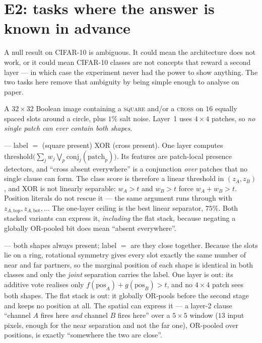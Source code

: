 \section{E2: tasks where the answer is known in advance}
\label{sec:synthetic}

A null result on CIFAR-10 is ambiguous. It could mean the architecture does not work, or it
could mean CIFAR-10 classes are not concepts that reward a second layer --- in which case the
experiment never had the power to show anything. The two tasks here remove that ambiguity by
being simple enough to analyse on paper.

 A $32\times32$ Boolean image containing a \textsc{square} and/or a
\textsc{cross} on $16$ equally spaced slots around a circle, plus $1\%$ salt noise. Layer~1
uses $4\times4$ patches, so \emph{no single patch can ever contain both shapes}.

 --- label $=$ (square present) XOR (cross present). One layer computes
$\mathrm{threshold}\big(\sum_j w_j \bigvee_p \mathrm{conj}_j(\text{patch}_p)\big)$. Its
features are patch-local presence detectors, and ``cross absent everywhere'' is a conjunction
\emph{over} patches that no single clause can form. The class score is therefore a linear
threshold in $(z_A, z_B)$, and XOR is not linearly separable: $w_A > t$ and $w_B > t$ force
$w_A + w_B > t$. Position literals do not rescue it --- the same argument runs through with
$z_{A,\text{top}}, z_{A,\text{bot}}, \dots$ The one-layer ceiling is the best linear
separator, $75\%$. Both stacked variants can express it, \emph{including} the flat stack,
because negating a globally OR-pooled bit does mean ``absent everywhere''.

 --- both shapes always present; label $=$ are they close together.
Because the slots lie on a ring, rotational symmetry gives every slot exactly the same number
of near and far partners, so the marginal position of each shape is identical in both classes
and only the \emph{joint} separation carries the label. One layer is out: its additive vote
realises only $f(\mathrm{pos}_A) + g(\mathrm{pos}_B) > t$, and no $4\times4$ patch sees both
shapes. The flat stack is out: it globally OR-pools before the second stage and keeps no
position at all. The spatial \mctm can express it --- a layer-2 clause ``channel $A$ fires
here \emph{and} channel $B$ fires here'' over a $5\times5$ window ($13$ input pixels, enough
for the near separation and not the far one), OR-pooled over positions, is exactly
``somewhere the two are close''.

